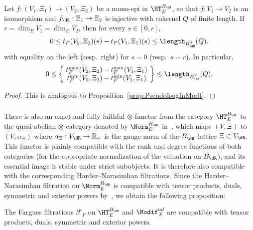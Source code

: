 \begin{prop}
Let $f:(V_{1},\Xi_{1})\rightarrow(V_{2},\Xi_{2})$ be a mono-epi in $\HT_{E}^{B_{\dR}}$, so that $f:V_{1}\rightarrow V_{2}$ is an isomorphism and $f_{\dR}:\Xi_{1}\rightarrow\Xi_{2}$ is injective with cokernel $Q$ of finite length. If $r=\dim_{E}V_{1}=\dim_{E}V_{2}$, then for every $s\in[0,r]$,
\[
0\leq t_{F}(V_{2},\Xi_{2})(s)-t_{F}(V_{1},\Xi_{1})(s)\leq\length_{B_{\dR}^{+}}(Q).
\]
with equality on the left (resp.~right) for $s=0$ (resp.~$s=r$). In particular,
\[
0\leq\left\{\!
\begin{array}{c}
t_{F}^{\max}(V_{2},\Xi_{2})-t_{F}^{\max}(V_{1},\Xi_{1})\\
t_{F}^{\min}(V_{2},\Xi_{2})-t_{F}^{\min}(V_{1},\Xi_{1})
\end{array}\!\right\} \leq\length_{B_{\dR}^{+}}(Q).
\]
\end{prop}

\begin{proof}
This is analogous to Proposition~\ref{prop:PseudoIsogInModt}.
\end{proof}

\subsubsection{}

There is also an exact and fully faithful $\otimes$-functor from the category $\HT_{E}^{B_{\dR}}$ to the quasi-abelian $\otimes$-category denoted by $\Norm_{E}^{B_{\dR}}$ in~\cite[\S 5.2]{Co16}, which maps $(V,\Xi)$ to $(V,\alpha_{\Xi})$ where $\alpha_{\Xi}:V_{\dR}\rightarrow\mathbb{R}_{+}$ is the gauge norm of the $B_{\dR}^{+}$-lattice $\Xi\subset V_{\dR}$. This functor is plainly compatible with the rank and degree functions of both categories (for the appropriate normalization of the valuation on $B_{\dR}$), and its essential image is stable under strict subobjects. It is therefore also compatible with the corresponding Harder--Narasimhan filtrations. Since the Harder--Narasimhan filtration on $\Norm_{E}^{B_{\dR}}$ is compatible with tensor products, duals, symmetric and exterior powers by~\cite[Proposition~28]{Co16}, we obtain the following proposition:

\begin{prop}\label{prop:OnHT+AdModif_Farguestensor}
The Fargues filtrations $\mathcal{F}_{F}$ on $\HT_{E}^{B_{\dR}}$ and $\Modif_{X}^{ad}$ are compatible with tensor products, duals, symmetric and exterior powers.
\end{prop}

